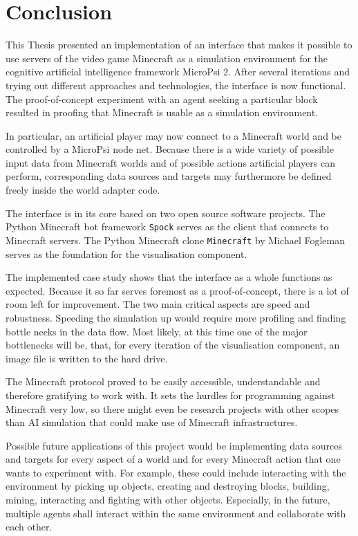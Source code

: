 \chapter{Conclusion}
This Thesis presented an implementation of an interface that makes it possible to use servers of the video game Minecraft as a simulation environment for the cognitive artificial intelligence framework MicroPsi 2. After several iterations and trying out different approaches and technologies, the interface is now functional. The proof-of-concept experiment with an agent seeking a particular block resulted in proofing that Minecraft is usable as a simulation environment.

In particular, an artificial player may now connect to a Minecraft world and be controlled by a MicroPsi node net. Because there is a wide variety of possible input data from Minecraft worlds and of possible actions artificial players can perform, corresponding data sources and targets may furthermore be defined freely inside the world adapter code.

The interface is in its core based on two open source software projects. The Python Minecraft bot framework \texttt{Spock} serves as the client that connects to Minecraft servers. The Python Minecraft clone \texttt{Minecraft} by Michael Fogleman serves as the foundation for the visualisation component.

The implemented case study shows that the interface as a whole functions as expected. Because it so far serves foremost as a proof-of-concept, there is a lot of room left for improvement. The two main critical aspects are speed and robustness. Speeding the simulation up would require more profiling and finding bottle necks in the data flow. Most likely, at this time one of the major bottlenecks will be, that, for every iteration of the visualisation component, an image file is written to the hard drive.

The Minecraft protocol proved to be easily accessible, understandable and therefore gratifying to work with. It sets the hurdles for programming against Minecraft very low, so there might even be research projects with other scopes than AI simulation that could make use of Minecraft infrastructures.

Possible future applications of this project would be implementing data sources and targets for every aspect of a world and for every Minecraft action that one wants to experiment with. For example, these could include interacting with the environment by picking up objects, creating and destroying blocks, building, mining, interacting and fighting with other objects. Especially, in the future, multiple agents shall interact within the same environment and collaborate with each other.